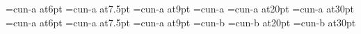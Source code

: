 \def\WD{\hskip0pt plus.005fil}
\def\WP{\hskip0pt plus.1fil}
\def\WH{\hskip0pt plus1fil\relax
       \hbox{\hfil}\penalty0\ \hbox{\hfil}\hskip0pt plus1fil}
\def\WHH{\hskip0pt plus1.1fil\relax
       \hbox{\hfil}\penalty0\ \hbox{\hfil}\hskip0pt plus1fil}
\def\WS{\hskip0pt plus1fill\relax
       \hbox{\hfil}\penalty0\ \penalty1\hbox{\hfil}\hskip0pt plus1fill}
\def\WB{\hbox{\hfil}\hskip0pt plus.0001fil}
\font\NANOcuna=cun-a at6pt
\font\TINYcuna=cun-a at7.5pt
\font\SMALLcuna=cun-a at9pt
\font\NORMcuna=cun-a
\font\BIGcuna=cun-a at20pt
\font\HUGEcuna=cun-a at30pt
\font\NANOcunb=cun-a at6pt
\font\TINYcunb=cun-a at7.5pt
\font\SMALLcunb=cun-a at9pt
\font\NORMcunb=cun-b
\font\BIGcunb=cun-b at20pt
\font\HUGEcunb=cun-b at30pt
\def\NANOw{\let\cuna\NANOcuna\let\cunb\NANOcunb}
\def\TINYw{\let\cuna\TINYcuna\let\cunb\TINYcunb}
\def\SMALLw{\let\cuna\SMALLcuna\let\cunb\SMALLcunb}
\def\NORMw{\let\cuna\NORMcuna\let\cunb\NORMcunb}
\def\BIGw{\let\cuna\BIGcuna\let\cunb\BIGcunb}
\def\HUGEw{\let\cuna\HUGEcuna\let\cunb\HUGEcunb}
\NORMw
